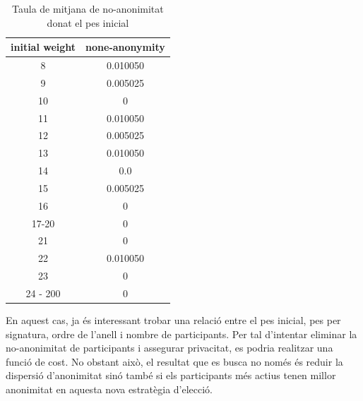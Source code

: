 \documentclass{article}
\begin{document}
\begin{table}[H]
	\centering
	\begin{tabular}{cc}
		initial weight & none-anonymity\\\hline
		8 & 0.010050 \\
		9 & 0.005025 \\
		10 & 0\\
		11& 0.010050\\
		12&0.005025 \\
		13&0.010050	\\
		14& 0.0 \\
		15&0.005025\\
		16& 0 \\
		17-20 & 0 \\
		21& 0 \\
		22 & 0.010050\\
		23& 0 \\
		24 - 200& 0 \\
	\end{tabular}
\label{tab1}
\caption{Taula de mitjana de no-anonimitat donat el pes inicial}
\end{table}
En aquest cas, ja és interessant trobar una relació entre el pes inicial, pes per signatura, ordre de l'anell i nombre de participants. Per tal d'intentar eliminar la no-anonimitat de participants i assegurar privacitat, es podria realitzar una funció de cost. No obstant això, el resultat que es busca no només és reduir la dispersió d'anonimitat sinó també si els participants més actius tenen millor anonimitat en aquesta nova estratègia d'elecció.
\end{document}
